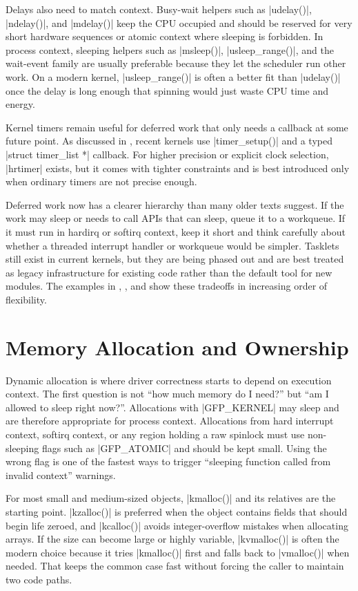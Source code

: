 \documentclass[10pt, oneside]{book}
\begin{document}
Delays also need to match context.
Busy-wait helpers such as \cpp|udelay()|, \cpp|ndelay()|, and \cpp|mdelay()|
keep the CPU occupied and should be reserved for very short hardware sequences
or atomic context where sleeping is forbidden.
In process context, sleeping helpers such as \cpp|msleep()|,
\cpp|usleep_range()|, and the wait-event family are usually preferable because
they let the scheduler run other work.
On a modern kernel, \cpp|usleep_range()| is often a better fit than
\cpp|udelay()| once the delay is long enough that spinning would just waste CPU
time and energy.

Kernel timers remain useful for deferred work that only needs a callback at some
future point.
As discussed in , recent kernels use
\cpp|timer_setup()| and a typed \cpp|struct timer_list *| callback.
For higher precision or explicit clock selection, \cpp|hrtimer| exists, but it
comes with tighter constraints and is best introduced only when ordinary timers
are not precise enough.

Deferred work now has a clearer hierarchy than many older texts suggest.
If the work may sleep or needs to call APIs that can sleep, queue it to a
workqueue.
If it must run in hardirq or softirq context, keep it short and think carefully
about whether a threaded interrupt handler or workqueue would be simpler.
Tasklets still exist in current kernels, but they are being phased out and are
best treated as legacy infrastructure for existing code rather than the default
tool for new modules.
The examples in , , and
 show these tradeoffs in increasing order of flexibility.

\section{Memory Allocation and Ownership}
\label{sec:memory_allocation}
Dynamic allocation is where driver correctness starts to depend on execution
context.
The first question is not ``how much memory do I need?'' but ``am I allowed to
sleep right now?''.
Allocations with \cpp|GFP_KERNEL| may sleep and are therefore appropriate for
process context.
Allocations from hard interrupt context, softirq context, or any region holding
a raw spinlock must use non-sleeping flags such as \cpp|GFP_ATOMIC| and should
be kept small.
Using the wrong flag is one of the fastest ways to trigger ``sleeping function
called from invalid context'' warnings.

For most small and medium-sized objects, \cpp|kmalloc()| and its relatives are
the starting point.
\cpp|kzalloc()| is preferred when the object contains fields that should begin
life zeroed, and \cpp|kcalloc()| avoids integer-overflow mistakes when
allocating arrays.
If the size can become large or highly variable, \cpp|kvmalloc()| is often the
modern choice because it tries \cpp|kmalloc()| first and falls back to
\cpp|vmalloc()| when needed.
That keeps the common case fast without forcing the caller to maintain two code
paths.
\end{document}
